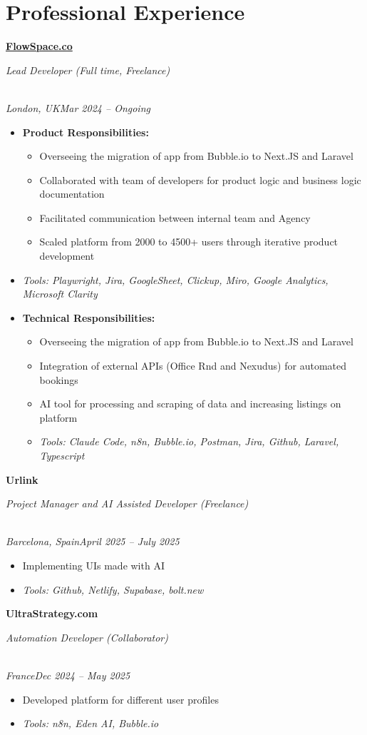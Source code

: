 \documentclass[a4paper,10pt]{article}
\newcommand{\role}[4]{\vspace{3pt}\noindent\hspace{0.6em}\parbox[t]{0.38\textwidth}{\raggedright\textbf{#1}}\hfill\parbox[t]{0.58\textwidth}{\raggedleft\textit{#2}}\\{\textit{#3}\hfill\textit{#4}}\vspace{1pt}}
\begin{document}
\section{Professional Experience}
\role{\href{https://flowspace.co}{FlowSpace.co}}{Lead Developer (Full time, Freelance)}{London, UK}{Mar 2024 -- Ongoing}
\begin{itemize}
\item \textbf{Product Responsibilities:}
\begin{itemize}[label=--]
\item Overseeing the migration of app from Bubble.io to Next.JS and Laravel
\item Collaborated with team of developers for product logic and business logic documentation
\item Facilitated communication between internal team and Agency
\item Scaled platform from 2000 to 4500+ users through iterative product development
\end{itemize}
\item \textit{Tools: Playwright, Jira, GoogleSheet, Clickup, Miro, Google Analytics, Microsoft Clarity}
\item \textbf{Technical Responsibilities:}
\begin{itemize}[label=--]
\item Overseeing the migration of app from Bubble.io to Next.JS and Laravel
\item Integration of external APIs (Office Rnd and Nexudus) for automated bookings
\item AI tool for processing and scraping of data and increasing listings on platform
\item \textit{Tools: Claude Code, n8n, Bubble.io, Postman, Jira, Github, Laravel, Typescript}
\end{itemize}
\end{itemize}

\role{Urlink}{Project Manager and AI Assisted Developer (Freelance)}{Barcelona, Spain}{April 2025 -- July 2025}
\begin{itemize}
\item Implementing UIs made with AI
\item \textit{Tools: Github, Netlify, Supabase, bolt.new}
\end{itemize}

\role{UltraStrategy.com}{Automation Developer (Collaborator)}{France}{Dec 2024 -- May 2025}
\begin{itemize}
\item Developed platform for different user profiles
\item \textit{Tools: n8n, Eden AI, Bubble.io}
\end{itemize}
\end{document}
